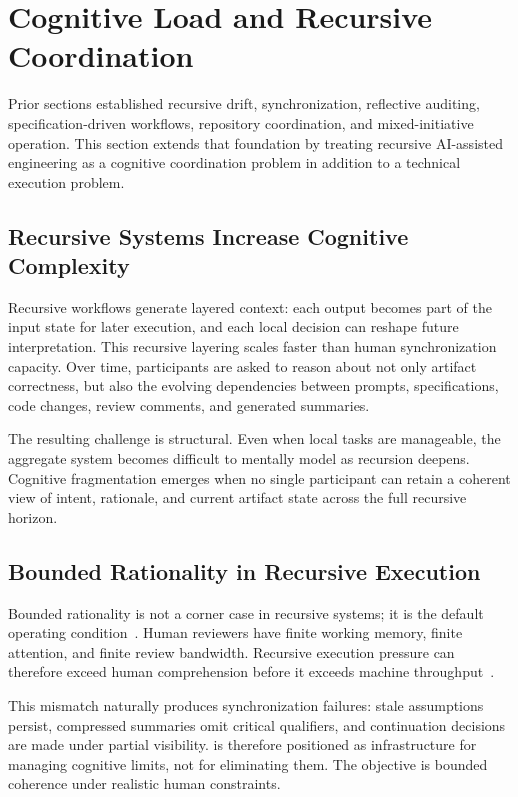 \section{Cognitive Load and Recursive Coordination}
\label{sec:cognitive-load-recursive-coordination}

Prior sections established recursive drift, synchronization, reflective auditing, specification-driven workflows, repository coordination, and mixed-initiative operation. This section extends that foundation by treating recursive AI-assisted engineering as a cognitive coordination problem in addition to a technical execution problem.

\subsection{Recursive Systems Increase Cognitive Complexity}

Recursive workflows generate layered context: each output becomes part of the input state for later execution, and each local decision can reshape future interpretation. This recursive layering scales faster than human synchronization capacity. Over time, participants are asked to reason about not only artifact correctness, but also the evolving dependencies between prompts, specifications, code changes, review comments, and generated summaries.

The resulting challenge is structural. Even when local tasks are manageable, the aggregate system becomes difficult to mentally model as recursion deepens. Cognitive fragmentation emerges when no single participant can retain a coherent view of intent, rationale, and current artifact state across the full recursive horizon.

\subsection{Bounded Rationality in Recursive Execution}

Bounded rationality is not a corner case in recursive systems; it is the default operating condition~\cite{Simon1957ModelsMan}. Human reviewers have finite working memory, finite attention, and finite review bandwidth. Recursive execution pressure can therefore exceed human comprehension before it exceeds machine throughput~\cite{Sweller1988CognitiveLoad}.

This mismatch naturally produces synchronization failures: stale assumptions persist, compressed summaries omit critical qualifiers, and continuation decisions are made under partial visibility.  is therefore positioned as infrastructure for managing cognitive limits, not for eliminating them. The objective is bounded coherence under realistic human constraints.


